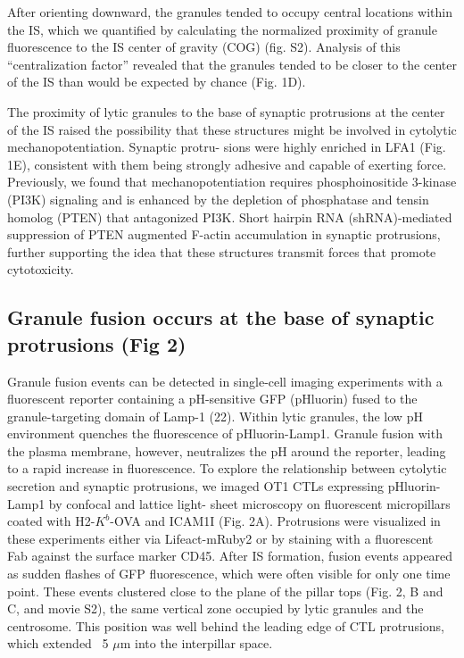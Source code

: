After orienting downward, the granules tended to occupy central locations within the IS, which we quantified by calculating the normalized proximity of granule fluorescence to the IS center of gravity (COG) (fig. S2). Analysis of this “centralization factor” revealed that the granules tended to be closer to the center of the IS than would be expected by chance (Fig. 1D).

The proximity of lytic granules to the base of synaptic protrusions at the center of the IS raised the possibility that these structures might be involved in cytolytic mechanopotentiation. Synaptic protru- sions were highly enriched in LFA1 (Fig. 1E), consistent with them being strongly adhesive and capable of exerting force. Previously, we found that mechanopotentiation requires phosphoinositide 3-kinase (PI3K) signaling and is enhanced by the depletion of phosphatase and tensin homolog (PTEN) that antagonized PI3K. Short hairpin RNA (shRNA)-mediated suppression of PTEN augmented F-actin accumulation in synaptic protrusions, further supporting the idea that these structures transmit forces that promote cytotoxicity.

\subsection{Granule fusion occurs at the base of synaptic protrusions (Fig 2)}
Granule fusion events can be detected in single-cell imaging experiments with a fluorescent reporter containing a pH-sensitive GFP (pHluorin) fused to the granule-targeting domain of Lamp-1 (22). Within lytic granules, the low pH environment quenches the fluorescence of pHluorin-Lamp1. Granule fusion with the plasma membrane, however, neutralizes the pH around the reporter, leading to a rapid increase in fluorescence. To explore the relationship between cytolytic secretion and synaptic protrusions, we imaged OT1 CTLs expressing pHluorin-Lamp1 by confocal and lattice  light- sheet
microscopy on fluorescent micropillars coated with H2-$K^{b}$-OVA and ICAM1I (Fig. 2A). Protrusions were visualized in these experiments either via Lifeact-mRuby2 or by staining with a fluorescent Fab against the surface marker CD45. After IS formation, fusion events appeared as sudden flashes of GFP fluorescence, which were often visible for only one time point. These events clustered close to the plane of the pillar tops (Fig. 2, B and C, and movie S2), the same vertical zone occupied by lytic granules and the centrosome. This position was well behind the leading edge of CTL protrusions, which extended ~5 $\mu$m into the interpillar space.


